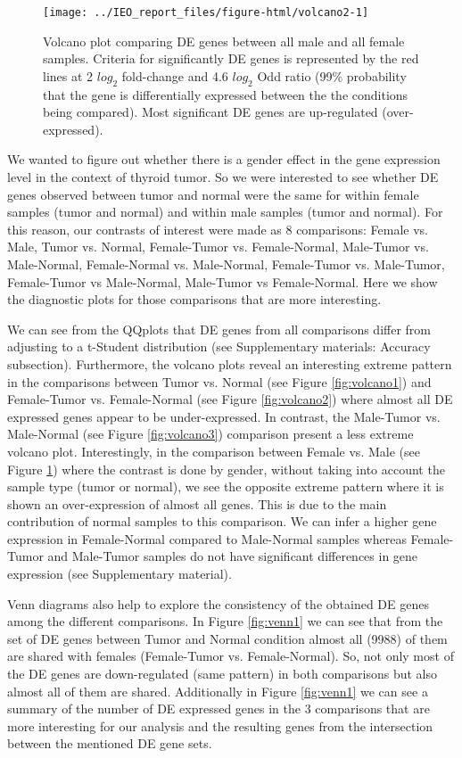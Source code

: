 \documentclass[9pt,twocolumn,twoside]{gsajnl}
\begin{document}
\begin{figure}
\centering
\texttt{[image: ../IEO\_report\_files/figure-html/volcano2-1]}
\caption{Volcano plot comparing DE genes between all male and all female samples. Criteria for significantly DE genes is represented by the red lines at 2 $log_{2}$ fold-change and 4.6 $log_{2}$ Odd ratio (99\% probability that the gene is differentially expressed between the the conditions being compared). Most significant DE genes are up-regulated (over-expressed).}
\label{fig:volcano4}
\end{figure}

We wanted to figure out whether there is a gender effect in the gene expression level in the context of thyroid tumor. So we were interested to see whether DE genes observed between tumor and normal were the same for within female samples (tumor  and normal) and within male samples (tumor and normal). For this reason, our contrasts of interest were made as 8 comparisons: 
Female vs. Male, Tumor vs. Normal, Female-Tumor vs. Female-Normal,  Male-Tumor vs. Male-Normal, Female-Normal vs. Male-Normal, Female-Tumor vs. Male-Tumor, Female-Tumor vs Male-Normal, Male-Tumor vs Female-Normal. Here we show the diagnostic plots for those comparisons that are more interesting.

We can see from the QQplots that DE genes from all comparisons differ from adjusting to a t-Student distribution (see Supplementary materials: Accuracy subsection). Furthermore, the volcano plots reveal an interesting extreme pattern in the comparisons between Tumor vs. Normal (see Figure \ref{fig:volcano1}) and Female-Tumor vs. Female-Normal (see Figure \ref{fig:volcano2}) where almost all DE expressed genes appear to be under-expressed. In contrast, the Male-Tumor vs. Male-Normal (see Figure \ref{fig:volcano3}) comparison present a less extreme volcano plot. Interestingly, in the comparison between Female vs. Male (see Figure \ref{fig:volcano4}) where the contrast is done by gender, without taking into account the sample type (tumor or normal), we see the opposite extreme pattern where it is shown an over-expression of almost all genes. This is due to the main contribution of normal samples to this comparison. We can infer a higher gene expression in Female-Normal compared to Male-Normal samples whereas Female-Tumor and Male-Tumor samples do not have significant differences in gene expression (see Supplementary material). 

Venn diagrams also help to explore the consistency of the obtained DE genes among the different comparisons. In Figure \ref{fig:venn1} we can see that from the set of DE genes between Tumor and Normal condition almost all (9988) of them are shared with females (Female-Tumor vs. Female-Normal). So, not only most of the DE genes are down-regulated (same pattern) in both comparisons but also almost all of them are shared. Additionally in Figure \ref{fig:venn1} we can see a summary of the number of DE expressed genes in the 3 comparisons that are more interesting for our analysis and the resulting genes from the intersection between the mentioned DE gene sets.
\end{document}
